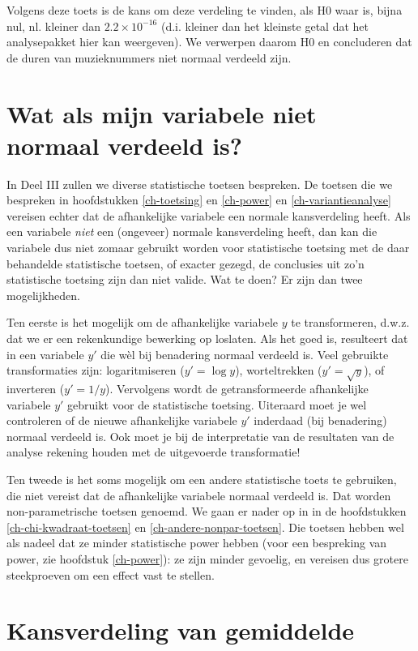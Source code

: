 \documentclass[
]{book}
\begin{document}
Volgens deze toets is de kans om deze verdeling te vinden, als H0 waar
is, bijna nul, nl. kleiner dan \(2.2 \times 10^{-16}\) (d.i. kleiner dan
het kleinste getal dat het analysepakket hier kan weergeven). We
verwerpen daarom H0 en concluderen dat de duren van muzieknummers niet
normaal verdeeld zijn.

\section{Wat als mijn variabele niet normaal verdeeld is?}\label{sec:watalsnietnormaal}

In Deel III zullen we diverse statistische
toetsen bespreken. De toetsen die we bespreken in hoofdstukken
\ref{ch-toetsing} en \ref{ch-power} en \ref{ch-variantieanalyse}
vereisen echter dat de afhankelijke
variabele een normale kansverdeling heeft. Als een variabele \emph{niet} een
(ongeveer) normale kansverdeling heeft, dan kan die variabele dus niet
zomaar gebruikt worden voor statistische toetsing met de daar behandelde
statistische toetsen, of exacter gezegd, de conclusies uit zo'n
statistische toetsing zijn dan niet valide. Wat te doen? Er zijn dan
twee mogelijkheden.

Ten eerste is het mogelijk om de afhankelijke variabele \(y\) te
transformeren, d.w.z. dat we er een rekenkundige bewerking op loslaten.
Als het goed is, resulteert dat in een variabele \(y'\) die wèl bij
benadering normaal verdeeld is. Veel gebruikte transformaties zijn:
logaritmiseren (\(y'=\log{y}\)), worteltrekken (\(y'=\sqrt{y}\)), of
inverteren (\(y'=1/y\)). Vervolgens wordt de getransformeerde
afhankelijke variabele \(y'\) gebruikt voor de statistische toetsing.
Uiteraard moet je wel controleren of de nieuwe afhankelijke variabele
\(y'\) inderdaad (bij benadering) normaal verdeeld is. Ook moet je bij de
interpretatie van de resultaten van de analyse rekening houden met de
uitgevoerde transformatie!

Ten tweede is het soms mogelijk om een andere statistische toets te
gebruiken, die niet vereist dat de afhankelijke variabele normaal
verdeeld is. Dat worden non-parametrische toetsen genoemd. We gaan er
nader op in in de hoofdstukken \ref{ch-chi-kwadraat-toetsen} en
\ref{ch-andere-nonpar-toetsen}.
Die toetsen hebben wel als nadeel
dat ze minder statistische power hebben (voor een bespreking van power,
zie hoofdstuk \ref{ch-power}): ze zijn minder gevoelig, en vereisen dus grotere
steekproeven om een effect vast te stellen.

\section{Kansverdeling van gemiddelde}\label{sec:CentraalLimietTheorema}
\end{document}
